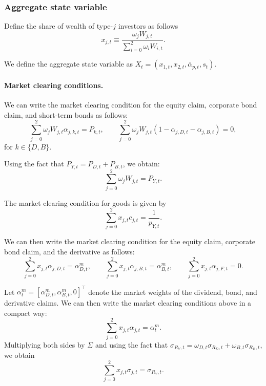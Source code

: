 \subsubsection{Aggregate state variable}

Define the share of wealth of type-$j$ investors as follows
\begin{equation}
    x_{j,t} \equiv \frac{\omega_j W_{j,t}}{\sum_{i=0}^2 \omega_i W_{i,t}}.
\end{equation}


We define the aggregate state variable as $X_t = (x_{1,t}, x_{2,t}, \overline{\alpha}_{p,t}, s_t)$.

\paragraph{Market clearing conditions.}
We can write the market clearing condition for the equity claim, corporate bond claim, and short-term bonds as follows:
\begin{equation}
    \sum_{j=0}^2 \omega_j W_{j,t} \alpha_{j,k,t} = P_{k,t}, \qquad 
    \sum_{j=0}^2 \omega_j W_{j,t} (1-\alpha_{j,D,t}-\alpha_{j,B,t}) = 0,
\end{equation}
for $k \in \{D,B\}$.

Using the fact that $P_{Y,t} = P_{D,t} + P_{B,t}$, we obtain:
\begin{equation}
    \sum_{j=0}^2 \omega_j W_{j,t} = P_{Y,t}.
\end{equation}

The market clearing condition for goods is given by
\begin{equation}
    \sum_{j=0}^2 x_{j,t} c_{j,t} = \frac{1}{p_{Y,t}}.
\end{equation}

We can then write the market clearing condition for the equity claim, corporate bond claim, and the derivative as follows:
\begin{equation}
    \sum_{j=0}^2 x_{j,t} \alpha_{j,D,t} = \alpha_{D,t}^m, \qquad 
    \sum_{j=0}^2 x_{j,t} \alpha_{j,B,t} = \alpha_{B,t}^m, \qquad 
    \sum_{j=0}^2 x_{j,t} \alpha_{j,F,t} = 0.
\end{equation}  

Let $\alpha_t^m = [\alpha_{D,t}^m, \alpha_{B,t}^m,0]^\top$ denote the market weights of the dividend, bond, and derivative claims.
We can then write the market clearing conditions above in a compact way:
\begin{equation}
    \sum_{j=0}^2 x_{j,t} \alpha_{j,t} = \alpha_t^m.
\end{equation}
Multiplying both sides by $\Sigma$ and using the fact that $\sigma_{R_Y,t} = \omega_{D,t} \sigma_{R_D,t} + \omega_{B,t} \sigma_{R_B,t}$, we obtain
\begin{equation}
    \sum_{j=0}^2 x_{j,t} \sigma_{j,t} = \sigma_{R_Y,t}.
\end{equation}

